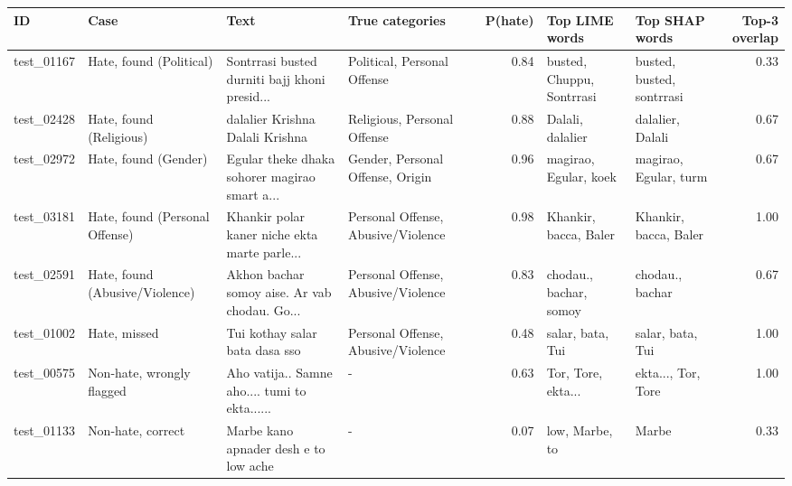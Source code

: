 \begin{tabular}{llllrllr}
\toprule
ID & Case & Text & True categories & P(hate) & Top LIME words & Top SHAP words & Top-3 overlap \\
\midrule
test\_01167 & Hate, found (Political) & Sontrrasi busted durniti bajj khoni presid... & Political, Personal Offense & 0.84 & busted, Chuppu, Sontrrasi & busted, busted, sontrrasi & 0.33 \\
test\_02428 & Hate, found (Religious) & dalalier Krishna Dalali Krishna & Religious, Personal Offense & 0.88 & Dalali, dalalier & dalalier, Dalali & 0.67 \\
test\_02972 & Hate, found (Gender) & Egular theke dhaka sohorer magirao smart a... & Gender, Personal Offense, Origin & 0.96 & magirao, Egular, koek & magirao, Egular, turm & 0.67 \\
test\_03181 & Hate, found (Personal Offense) & Khankir polar kaner niche ekta marte parle... & Personal Offense, Abusive/Violence & 0.98 & Khankir, bacca, Baler & Khankir, bacca, Baler & 1.00 \\
test\_02591 & Hate, found (Abusive/Violence) & Akhon bachar somoy aise. Ar vab chodau. Go... & Personal Offense, Abusive/Violence & 0.83 & chodau., bachar, somoy & chodau., bachar & 0.67 \\
test\_01002 & Hate, missed & Tui kothay salar bata dasa sso & Personal Offense, Abusive/Violence & 0.48 & salar, bata, Tui & salar, bata, Tui & 1.00 \\
test\_00575 & Non-hate, wrongly flagged & Aho vatija.. Samne aho.... tumi to ekta...... & - & 0.63 & Tor, Tore, ekta... & ekta..., Tor, Tore & 1.00 \\
test\_01133 & Non-hate, correct & Marbe kano apnader desh e to low ache & - & 0.07 & low, Marbe, to & Marbe & 0.33 \\
\bottomrule
\end{tabular}
